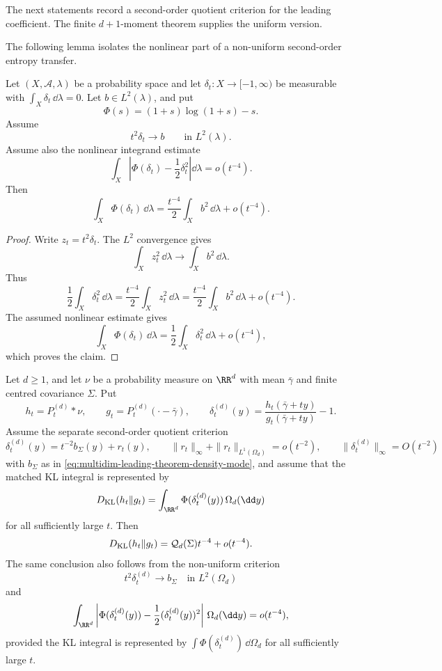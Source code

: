 The next statements record a second-order quotient criterion for the leading
coefficient.  The finite \(d+1\)-moment theorem supplies the uniform version.

\noindent The following lemma isolates the nonlinear part of a non-uniform
second-order entropy transfer.

\begin{lemma}%
\label{lem:l2-second-order-entropy-criterion}
Let \((X,\mathcal A,\lambda)\) be a probability space and let
\(\delta_t:X\to[-1,\infty)\) be measurable with
\(\int_X\delta_t\,\dd\lambda=0\).  Let \(b\in L^2(\lambda)\), and put
\[
  \Phi(s)=(1+s)\log(1+s)-s .
\]
Assume
\[
  t^2\delta_t\longrightarrow b
  \qquad\text{in }L^2(\lambda).
\]
Assume also the nonlinear integrand estimate
\[
  \int_X\left|\Phi(\delta_t)-\frac12\delta_t^2\right|\dd\lambda
  =o(t^{-4}).
\]
Then
\[
  \int_X\Phi(\delta_t)\,\dd\lambda
  =\frac{t^{-4}}2\int_X b^2\,\dd\lambda+o(t^{-4}).
\]
\end{lemma}

\begin{proof}
Write \(z_t=t^2\delta_t\).  The \(L^2\) convergence gives
\[
  \int_X z_t^2\,\dd\lambda\to\int_X b^2\,\dd\lambda .
\]
Thus
\[
  \frac12\int_X\delta_t^2\,\dd\lambda
  =\frac{t^{-4}}2\int_Xz_t^2\,\dd\lambda
  =\frac{t^{-4}}2\int_Xb^2\,\dd\lambda+o(t^{-4}).
\]
The assumed nonlinear estimate gives
\[
  \int_X\Phi(\delta_t)\,\dd\lambda
  =\frac12\int_X\delta_t^2\,\dd\lambda+o(t^{-4}),
\]
which proves the claim.
\end{proof}

\medskip

\begin{theorem}%
\label{thm:second-order-quotient-kl-coefficient}
\label{prop:second-order-quotient-criterion}
Let \(d\ge1\), and let \(\nu\) be a probability measure on \(\RR^d\) with
mean \(\bar{\gamma}\) and finite centred covariance \(\Sigma\).  Put
\[
  h_t=P_t^{(d)}*\nu,\qquad
  g_t=P_t^{(d)}(\cdot-\bar{\gamma}),\qquad
  \delta_t^{(d)}(y)=\frac{h_t(\bar{\gamma}+ty)}
  {g_t(\bar{\gamma}+ty)}-1 .
\]
Assume the separate second-order quotient criterion
\begin{equation}\label{eq:second-order-quotient-criterion}
  \delta_t^{(d)}(y)=t^{-2}b_\Sigma(y)+r_t(y),\qquad
  \|r_t\|_\infty+\|r_t\|_{L^1(\Omega_d)}=o(t^{-2}),\qquad
  \|\delta_t^{(d)}\|_\infty=O(t^{-2})
\end{equation}
with \(b_\Sigma\) as in
\eqref{eq:multidim-leading-theorem-density-mode}, and assume that the matched
KL integral is represented by
\[
D_{\rm KL}(h_t\|g_t)
=\int_{\RR^d}\Phi(\delta_t^{(d)}(y))\,\Omega_d(\dd y)
\]
for all sufficiently large \(t\).  Then
\[
D_{\rm KL}(h_t\|g_t)=\mathcal Q_d(\Sigma)t^{-4}+o(t^{-4}).
\]
The same conclusion also follows from the non-uniform criterion
\[
  t^2\delta_t^{(d)}\to b_\Sigma\quad\text{in }L^2(\Omega_d)
\]
and
\[
  \int_{\RR^d}\left|
  \Phi(\delta_t^{(d)}(y))-\frac12(\delta_t^{(d)}(y))^2
  \right|\,\Omega_d(\dd y)=o(t^{-4}),
\]
provided the KL integral is represented by
\(\int\Phi(\delta_t^{(d)})\,\dd\Omega_d\) for all sufficiently large \(t\).
\end{theorem}

